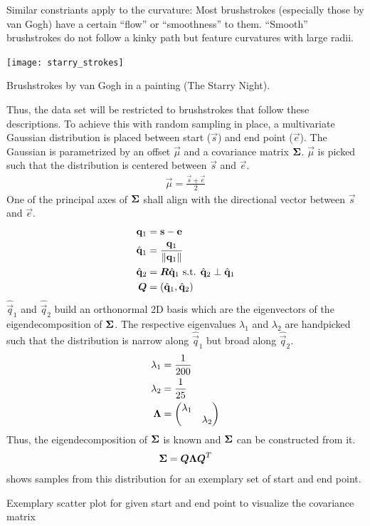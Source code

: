 Similar constriants apply to the curvature:
Most brushstrokes (especially those by van Gogh) have a certain ``flow'' or ``smoothness'' to them.
``Smooth'' brushstrokes do not follow a kinky path but feature curvatures with large radii.\\
\begin{marginfigure}
    \texttt{[image: starry\_strokes]}
    \caption{Brushstrokes by van Gogh in a painting (The Starry Night).}
\end{marginfigure}
Thus, the data set will be restricted to brushstrokes that follow these descriptions.
To achieve this with random sampling in place, a multivariate Gaussian distribution is placed between start ($\vec{s}$) and end point ($\vec{e}$).
The Gaussian is parametrized by an offset $\vec{\mu}$ and a covariance matrix $\boldsymbol{\Sigma}$.
$\vec{\mu}$ is picked such that the distribution is centered between $\vec{s}$ and $\vec{e}$.
\begin{align}
    \vec{\mu} = \frac{\vec{s} + \vec{e}}{2}
\end{align}
One of the principal axes of $\boldsymbol{\Sigma}$ shall align with the directional vector between $\vec{s}$ and $\vec{e}$.
\begin{align}
    \mathbf{q}_1 & = \mathbf{s} - \mathbf{e} \\
    \hat{\mathbf{q}}_1 & = \frac{\mathbf{q}_1}{\left\lVert\mathbf{q}_1\right\rVert} \\
    \hat{\mathbf{q}}_2 & = \boldsymbol{R} \hat{\mathbf{q}}_1 \text{ s.t. } \hat{\mathbf{q}}_2 \perp \hat{\mathbf{q}}_1 \\
    \boldsymbol{Q} & = (\hat{\mathbf{q}}_1, \hat{\mathbf{q}}_2)
\end{align}
$\hat{\vec{q}}_1$ and $\hat{\vec{q}}_2$ build an orthonormal 2D basis which are the eigenvectors of the eigendecomposition of $\boldsymbol{\Sigma}$.
The respective eigenvalues $\lambda_1$ and $\lambda_2$ are handpicked such that the distribution is narrow along $\hat{\vec{q}}_1$ but broad along $\hat{\vec{q}}_2$.
\begin{align}
    \lambda_1 & = \frac{1}{200} \\
    \lambda_2 & = \frac{1}{25} \\
    \boldsymbol{\Lambda} & = \begin{pmatrix} \lambda_1 & \\ & \lambda_2 \end{pmatrix}
\end{align}
Thus, the eigendecomposition of $\boldsymbol{\Sigma}$ is known and $\boldsymbol{\Sigma}$ can be constructed from it.
\begin{align}
    \boldsymbol{\Sigma} = \boldsymbol{Q} \boldsymbol{\Lambda} \boldsymbol{Q}^T
\end{align}
 shows samples from this distribution for an exemplary set of start and end point.
\begin{marginfigure}
    \resizebox{\textwidth}{!}{
        
    }
    \caption{Exemplary scatter plot for given start and end point to visualize the covariance matrix}
\end{marginfigure}

